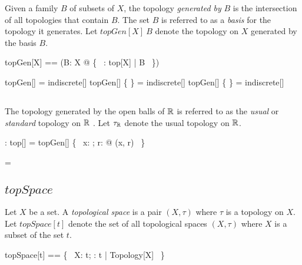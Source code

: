 \documentclass[11pt, oneside]{article}
\begin{document}
Given a family $B$ of subsets of $X$, the topology {\it generated by} $B$ is the intersection of all
topologies that contain $B$.
The set $B$ is referred to as a {\it basis} for the topology it generates.
Let $topGen[X]~B$ denote the topology on $X$ generated by the basis $B$.

\begin{zed}
	topGen[X] == (\lambda B: \family X @ \bigcap \{~ \tau: top[X] | B \subseteq \tau ~\})
\end{zed}

\begin{example}

\begin{zed}
	topGen[\nat] \emptyset = indiscrete[\nat]
\also
	topGen[\nat] \{ \emptyset \} = indiscrete[\nat]
\also
	topGen[\nat] \{ \nat \} = indiscrete[\nat]
\end{zed}

\end{example}

\subsection{}

The topology generated by the open balls of $\mathbb{R}$ is referred to as the {\it usual} or {\it standard} topology on $\mathbb{R}$ .
Let $\tau_{\mathbb{R}}$ denote the usual topology on $\mathbb{R}$.

\begin{axdef}
	\tauR: top[\R]
\where
	\tauR = topGen[\R] \{~ x: \R; r: \Rpos @ \ballRR(x, r) ~\}
\end{axdef}

\begin{remark}

\begin{zed}
	\tauR = \openR
\end{zed}

\end{remark}

\subsection{$topSpace$}

Let $X$ be a set.
A {\it topological space} is a pair $(X, \tau)$ where $\tau$ is a topology on $X$.
Let $topSpace[t]$ denote the set of all topological spaces $(X,\tau)$ where $X$ is a subset of the set $t$.

\begin{zed}
	topSpace[t] == \{~ X: \power t; \tau: \family t | Topology[X] ~\}
\end{zed}
\end{document}
